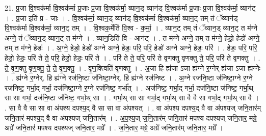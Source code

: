 \documentclass[17pt]{extarticle}
\begin{document}
21. प्र॒जा वि॒श्वक॑र्मा वि॒श्वक॑र्मा प्र॒जाः प्र॒जा वि॒श्वक॑र्मा॒ व्यान॒ड् व्यान॑ड् वि॒श्वक॑र्मा प्र॒जाः प्र॒जा वि॒श्वक॑र्मा॒ व्यान॑ट् । . प्र॒जा इति॑ प्र - जाः । . वि॒श्वक॑र्मा॒ व्यान॒ड् व्यान॑ड् वि॒श्वक॑र्मा वि॒श्वक॑र्मा॒ व्यान॒ट् तम् तं ॅव्यान॑ड् वि॒श्वक॑र्मा वि॒श्वक॑र्मा॒ व्यान॒ट् तम् । . वि॒श्वक॒र्मेति॑ वि॒श्व - क॒र्मा॒ । . व्यान॒ट् तम् तं ॅव्यान॒ड् व्यान॒ट् त म॑ग्ने अग्ने॒ तं ॅव्यान॒ड् व्यान॒ट् त म॑ग्ने । . व्यान॒डिति॑ वि - आन॑ट् । . त म॑ग्ने अग्ने॒ तम् त म॑ग्ने॒ हेडो॒ हेडो॑ अग्ने॒ तम् त म॑ग्ने॒ हेडः॑ । . अ॒ग्ने॒ हेडो॒ हेडो॑ अग्ने अग्ने॒ हेडः॒ परि॒ परि॒ हेडो॑ अग्ने अग्ने॒ हेडः॒ परि॑ । . हेडः॒ परि॒ परि॒ हेडो॒ हेडः॒ परि॑ ते ते॒ परि॒ हेडो॒ हेडः॒ परि॑ ते । . परि॑ ते ते॒ परि॒ परि॑ ते वृणक्तु वृणक्तु ते॒ परि॒ परि॑ ते वृणक्तु । . ते॒ वृ॒ण॒क्तु वृ॒ण॒क्तु॒ ते॒ ते॒ वृ॒ण॒क्तु॒ । . वृ॒ण॒क्त्विति॑ वृणक्तु । . अ॒जा हि ह्य॑जा ऽजा ह्य॑ग्ने र॒ग्नेर् ह्य॑जा ऽजा ह्य॑ग्नेः । . ह्य॑ग्ने र॒ग्नेर्. हि ह्य॑ग्ने रज॑नि॒ष्टा ज॑निष्टा॒ग्नेर्. हि ह्य॑ग्ने रज॑निष्ट । . अ॒ग्ने रज॑नि॒ष्टा ज॑निष्टा॒ग्ने र॒ग्ने रज॑निष्ट॒ गर्भा॒द् गर्भा॒ दज॑निष्टा॒ग्ने र॒ग्ने रज॑निष्ट॒ गर्भा᳚त् । . अज॑निष्ट॒ गर्भा॒द् गर्भा॒ दज॑नि॒ष्टा ज॑निष्ट॒ गर्भा॒थ् सा सा गर्भा॒ दज॑नि॒ष्टा ज॑निष्ट॒ गर्भा॒थ् सा । . गर्भा॒थ् सा सा गर्भा॒द् गर्भा॒थ् सा वै वै सा गर्भा॒द् गर्भा॒थ् सा वै । . सा वै वै सा सा वा अ॑पश्य दपश्य॒द् वै सा सा वा अ॑पश्यत् । . वा अ॑पश्य दपश्य॒द् वै वा अ॑पश्यज् जनि॒तार॑म् जनि॒तार॑ मपश्य॒द् वै वा अ॑पश्यज् जनि॒तार᳚म् । . अ॒प॒श्य॒ज् ज॒नि॒तार॑म् जनि॒तार॑ मपश्य दपश्यज् जनि॒तार॒ मग्रे॒ अग्रे॑ जनि॒तार॑ मपश्य दपश्यज् जनि॒तार॒ मग्रे᳚ । . ज॒नि॒तार॒ मग्रे॒ अग्रे॑ जनि॒तार॑म् जनि॒तार॒ मग्रे᳚ । \newline
\end{document}
